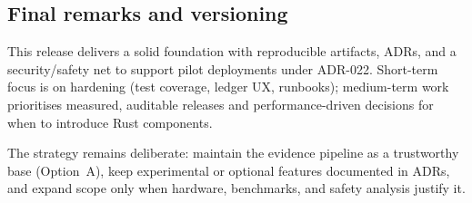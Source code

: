 \subsection{Final remarks and versioning}
\label{subsec:final-remarks}

This release delivers a solid foundation with reproducible artifacts, \ac{ADR}s, and a security/safety net to support pilot deployments under \ac{ADR}-022.
Short-term focus is on hardening (test coverage, ledger UX, runbooks); medium-term work prioritises measured, auditable releases and performance-driven decisions for when to introduce Rust components.

The strategy remains deliberate: maintain the evidence pipeline as a trustworthy base (Option~A), keep experimental or optional features documented in \ac{ADR}s, and expand scope only when hardware, benchmarks, and safety analysis justify it.
